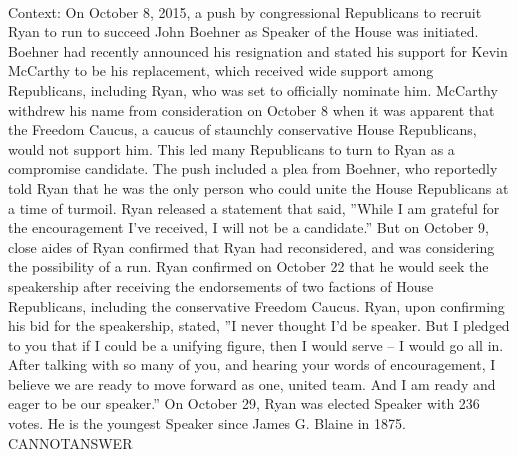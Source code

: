 \documentclass[11pt,a4paper, onecolumn]{article}
\begin{document}
\\ Context: On October 8, 2015, a push by congressional Republicans to recruit Ryan to run to succeed John Boehner as Speaker of the House was initiated. Boehner had recently announced his resignation and stated his support for Kevin McCarthy to be his replacement, which received wide support among Republicans, including Ryan, who was set to officially nominate him. McCarthy withdrew his name from consideration on October 8 when it was apparent that the Freedom Caucus, a caucus of staunchly conservative House Republicans, would not support him. This led many Republicans to turn to Ryan as a compromise candidate. The push included a plea from Boehner, who reportedly told Ryan that he was the only person who could unite the House Republicans at a time of turmoil. Ryan released a statement that said, ''While I am grateful for the encouragement I've received, I will not be a candidate.'' But on October 9, close aides of Ryan confirmed that Ryan had reconsidered, and was considering the possibility of a run. Ryan confirmed on October 22 that he would seek the speakership after receiving the endorsements of two factions of House Republicans, including the conservative Freedom Caucus. Ryan, upon confirming his bid for the speakership, stated, ''I never thought I'd be speaker. But I pledged to you that if I could be a unifying figure, then I would serve -- I would go all in. After talking with so many of you, and hearing your words of encouragement, I believe we are ready to move forward as one, united team. And I am ready and eager to be our speaker.'' On October 29, Ryan was elected Speaker with 236 votes. He is the youngest Speaker since James G. Blaine in 1875. CANNOTANSWER
\end{document}
